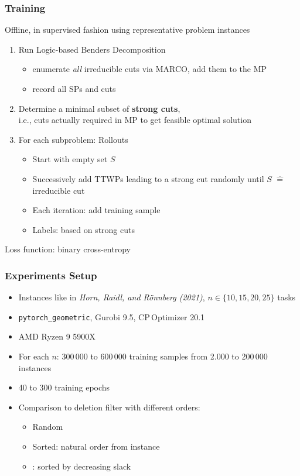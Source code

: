 \documentclass[aspectratio=1610]{beamer}
\newcommand{\important}[1]{{\color{green!60!black}#1}}
\begin{document}
\begin{frame}
	\frametitle{Training}
	Offline, in supervised fashion using representative problem instances

	\bigskip

	\medskip
	\begin{enumerate}
	\itemsep2ex
	\item \important{Run Logic-based Benders Decomposition}
		\begin{itemize}
		\item enumerate \important{\emph{all} irreducible cuts} via MARCO, add them to the MP
		\item record all SPs and cuts
		\end{itemize}
	\item Determine a minimal subset of \important{\bf strong cuts},\\
		i.e., cuts actually required in MP to get feasible optimal solution
	\item For each subproblem: \important{Rollouts}
		\begin{itemize}
		\item Start with empty set $S$
		\item Successively add TTWPs leading to a strong cut randomly until $S$ $\widehat{=}$ irreducible cut
		\item \important{Each iteration:} add \important{training sample}
		\item \important{Labels:} based on strong cuts
		\end{itemize}
	\end{enumerate}

	\bigskip
	Loss function: binary cross-entropy
\end{frame}




\begin{frame}[fragile]
	\frametitle{Experiments Setup}
	\begin{itemize}
	\item \important{Instances} like in \emph{Horn, Raidl, and Rönnberg (2021)}, $n\in\{10,15,20,25\}$ tasks
	\item \verb|pytorch_geometric|, Gurobi 9.5, CP\,Optimizer 20.1
	\item AMD Ryzen 9 5900X
	\item For each $n$: 300\,000 to 600\,000 training samples from 2.000 to 200\,000 instances
	\item 40 to 300 training epochs
	\vspace{6mm}
	\item Comparison to \important{deletion filter} with different orders:
		\begin{itemize}
		\item Random
		\item Sorted: natural order from instance
		\item \citet{2013_coban-hooker_article}: sorted by decreasing slack
		\end{itemize}
	\end{itemize}
\end{frame}
\end{document}
